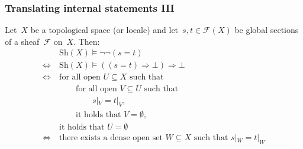 \documentclass[12pt,utf8,notheorems,compress,t]{beamer}
\newcommand{\F}{\mathcal{F}}
\newcommand{\Sh}{\mathrm{Sh}}
\renewcommand{\_}{\mathpunct{.}}
\newcommand{\?}{\,{:}\,}
\newcounter{framenumberpreappendix}
\newcommand{\backupend}{
  \addtocounter{framenumberpreappendix}{-\value{framenumber}}
  \addtocounter{framenumber}{\value{framenumberpreappendix}} 
}
\begin{document}
\begin{frame}\frametitle{Translating internal statements III}
  Let~$X$ be a topological space (or locale) and let~$s, t \in \F(X)$ be global
  sections of a sheaf~$\F$ on~$X$. Then:
  \allowdisplaybreaks
  \begin{align*}
    & \Sh(X) \models \neg\neg(s = t) \\[0.5em]
    \Longleftrightarrow\
    & \Sh(X) \models ((s = t) \Rightarrow \bot) \Rightarrow \bot \\[0.5em]
    \Longleftrightarrow\ &
      \text{for all open~$U \subseteq X$ such that} \\
    &\qquad
      \text{for all open~$V \subseteq U$ such that} \\
    &\qquad\qquad
      s|_V = t|_V, \\
    &\qquad
      \text{it holds that~$V = \emptyset$,} \\
    &
      \text{it holds that~$U = \emptyset$} \\[0.5em]
    \Longleftrightarrow\ &
      \text{there exists a dense open set~$W \subseteq X$ such that $s|_W = t|_W$} \\
  \end{align*}
\end{frame}

\backupend
\end{document}
